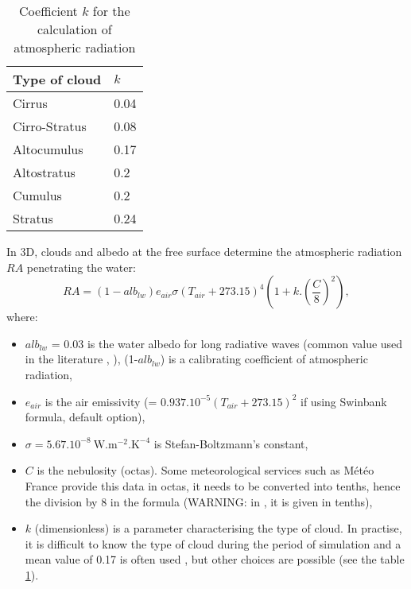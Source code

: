 \begin{table}[H]
\caption{Coefficient $k$ for the calculation of atmospheric radiation}
\label{tab_cloud_type}
\centering
\begin{tabular}{p{0.98in}p{0.39in}}
\hline
\multicolumn{1}{|p{0.98in}}{Type of cloud} & 
\multicolumn{1}{|p{0.39in}|}{$k$} \\
\hline
\multicolumn{1}{|p{0.98in}}{Cirrus} & 
\multicolumn{1}{|p{0.39in}|}{0.04} \\
\hline
\multicolumn{1}{|p{0.98in}}{Cirro-Stratus} & 
\multicolumn{1}{|p{0.39in}|}{0.08} \\
\hline
\multicolumn{1}{|p{0.98in}}{Altocumulus} & 
\multicolumn{1}{|p{0.39in}|}{0.17} \\
\hline
\multicolumn{1}{|p{0.98in}}{Altostratus} & 
\multicolumn{1}{|p{0.39in}|}{0.2} \\
\hline
\multicolumn{1}{|p{0.98in}}{Cumulus} & 
\multicolumn{1}{|p{0.39in}|}{0.2} \\
\hline
\multicolumn{1}{|p{0.98in}}{Stratus} & 
\multicolumn{1}{|p{0.39in}|}{0.24} \\
\hline

\end{tabular}
\end{table}

In 3D, clouds and albedo at
the free surface determine the atmospheric radiation $RA$ penetrating the water:
\begin{equation}
RA = (1-alb_{lw}) e_{air}\sigma(T_{air}+273.15)^{4}(1+k . \left( \frac{C}{8} \right)^{2}),
\end{equation}
where:
\begin{itemize}
\item $alb_{lw}$ = 0.03 is the water albedo for long radiative waves
  (common value used in the literature \cite{imerito_dyresm_2007},
  \cite{henderson-sellers_energy_balance_1986}),
  (1-$alb_{lw}$) is a calibrating coefficient of atmospheric radiation,
\item $e_{air}$ is the air emissivity (= $0.937.10^{-5}(T_{air}+273.15)^{2}$
if using Swinbank formula, default option),
\item $\sigma= 5.67.10^{-8}~\mathrm{{W.m^{-2}.K^{-4}}}$ is Stefan-Boltzmann's constant,
\item $C$ is the nebulosity (octas). Some meteorological services such as
M\'{e}t\'{e}o France provide this data in octas, it needs to be converted
into tenths, hence the division by 8 in the formula
(WARNING: in \khione, it is given in tenths),
\item $k$ (dimensionless) is a parameter characterising the type of
cloud. In practise, it is difficult to know the type of cloud during the
period of simulation and a mean value of 0.17 is often used \cite{tva_heat_1972},
\cite{imerito_dyresm_2007} but other choices are possible
(see the table \ref{tab_cloud_type}).
\end{itemize}

